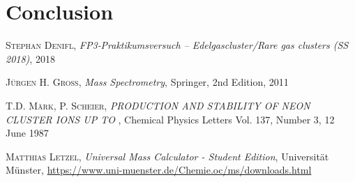 \documentclass[a4paper,10pt]{article}
\begin{document}
\section{Conclusion}

\begin{thebibliography}{99}

\textsc{Stephan Denifl}, \textit{FP3‐Praktikumsversuch – Edelgascluster/Rare gas clusters (SS 2018)}, 2018

\textsc{Jürgen H. Gross}, \textit{Mass Spectrometry}, Springer, 2nd Edition, 2011

\textsc{T.D. Märk, P. Scheier}, \textit{PRODUCTION AND STABILITY OF NEON CLUSTER IONS UP TO }, Chemical Physics Letters Vol. 137, Number 3, 12 June 1987

\textsc{Matthias Letzel}, \textit{Universal Mass Calculator - Student Edition}, Universität Münster, \url{https://www.uni-muenster.de/Chemie.oc/ms/downloads.html}
\end{thebibliography}
\end{document}
